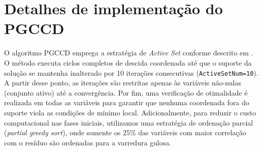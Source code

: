\chapter{Detalhes de implementação do PGCCD}
\label{chap:anexos_implementacao}

O algoritmo PGCCD emprega a estratégia de \textit{Active Set} conforme descrito em \cite{fastselect}. O método executa ciclos completos de descida coordenada até que o suporte da solução se mantenha inalterado por 10 iterações consecutivas (\texttt{ActiveSetNum=10}). A partir desse ponto, as iterações são restritas apenas às variáveis não-nulas (conjunto ativo) até a convergência. Por fim, uma verificação de otimalidade é realizada em todas as variáveis para garantir que nenhuma coordenada fora do suporte viola as condições de mínimo local. Adicionalmente, para reduzir o custo computacional nas fases iniciais, utilizamos uma estratégia de ordenação parcial (\textit{partial greedy sort}), onde somente os 25\% das variáveis com maior correlação com o resíduo são ordenadas para a varredura gulosa.
